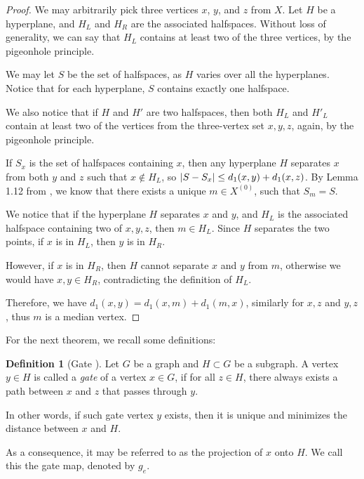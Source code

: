 \documentclass[12pt, a4paper]{article}
\theoremstyle{plain}
\theoremstyle{definition}
\newtheorem{definition}[theorem]{Definition}
\theoremstyle{remark}
\begin{document}
    \begin{proof}
        We may arbitrarily pick three vertices $x$, $y$, and $z$ from $X$. Let $H$ be a hyperplane, and $H_{L}$ and $H_{R}$ are the associated halfspaces. Without loss of generality, we can say that $H_{L}$ contains at least two of the three vertices, by the pigeonhole principle.
        
        We may let $S$ be the set of halfspaces, as $H$ varies over all the hyperplanes. Notice that for each hyperplane, $S$ contains exactly one halfspace.
        
        We also notice that if $H$ and $H'$ are two halfspaces, then both $H_{L}$ and $H'_{L}$ contain at least two of the vertices from the three-vertex set ${ x, y, z}$, again, by the pigeonhole principle.
        
        If $S_{x}$ is the set of halfspaces containing $x$, then any hyperplane $H$ separates $x$ from both $y$ and $z$ such that $x \notin H_{L}$, so $\abs{S - S_{x}} \leq d_{1}(x, y) + d_{1}(x, z)$. By Lemma 1.12 from \cite{hagen}, we know that there exists a unique $m \in X^{(0)}$, such that $S_{m} = S$.
        
        We notice that if the hyperplane $H$ separates $x$ and $y$, and $H_{L}$ is the associated halfspace containing two of ${ x, y, z}$, then $m \in H_{L}$. Since $H$ separates the two points, if $x$ is in $H_{L}$, then $y$ is in $H_{R}$.
        
        However, if $x$ is in $H_{R}$, then $H$ cannot separate $x$ and $y$ from $m$, otherwise we would have $x, y \in H_{R}$, contradicting the definition of $H_{L}$.
        
        Therefore, we have $d_{1}(x, y) = d_{1}(x, m) + d_{1}(m, x)$, similarly for $x, z$ and $y, z$, thus $m$ is a median vertex.
    \end{proof}
    
    For the next theorem, we recall some definitions:
    
    \begin{definition}[Gate \cite{genevois-rev}]
        Let $G$ be a graph and $H \subset G$ be a subgraph. A vertex $y \in H$ is called a \textit{gate} of a vertex $x \in G$, if for all $z \in H$, there always exists a path between $x$ and $z$ that passes through $y$.
        
        In other words, if such gate vertex $y$ exists, then it is unique and minimizes the distance between $x$ and $H$.
        
        As a consequence, it may be referred to as the projection of $x$ onto $H$. We call this the gate map, denoted by $g_{e}$.
    \end{definition}
    
\end{document}
